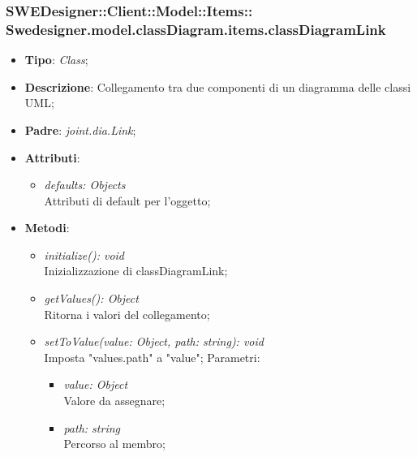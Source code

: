 \documentclass[../DefinizioneDiProdotto.tex]{subfiles}
\begin{document}
			\subsubsection[Swedesigner.model.classDiagram.items.classDiagramLink]{SWEDesigner::Client::Model::Items::\\Swedesigner.model.classDiagram.items.classDiagramLink}
			\hypertarget{SWEDesigner::Client::Model::Items::Swedesigner.model.classDiagram.items.classDiagramLink}{}
			\begin{itemize}
				\item \textbf{Tipo}: \emph{Class};
				\item \textbf{Descrizione}: Collegamento tra due componenti di un diagramma delle classi UML;
				\item \textbf{Padre}: \emph{joint.dia.Link};
				\item \textbf{Attributi}:
				\begin{itemize}
					\item \emph{defaults: Objects}\\
					Attributi di default per l'oggetto;
				\end{itemize}
				\item \textbf{Metodi}:
				\begin{itemize}
					\item \emph{initialize(): void}\\
					Inizializzazione di classDiagramLink;
					\item \emph{getValues(): Object}\\
					Ritorna i valori del collegamento;
					\item \emph{setToValue(value: Object, path: string): void}\\
					Imposta "values.path" a "value";
					Parametri:
					\begin{itemize}
						\item \emph{value: Object} \\
						Valore da assegnare;
						\item \emph{path: string} \\
						Percorso al membro;
					\end{itemize}
				\end{itemize}
			\end{itemize}
			
\end{document}
